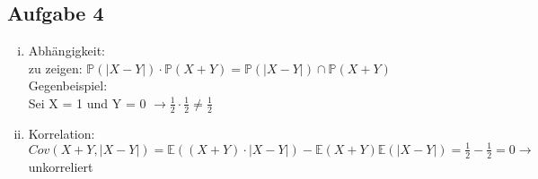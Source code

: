 \documentclass[10pt,a4paper,parskip=half]{scrartcl}
\begin{document}
\subsection*{Aufgabe 4}
\begin{enumerate}[(i)]
\item
Abhängigkeit: \\
zu zeigen:
$\mathbb{P}(|X-Y|) \cdot \mathbb{P}(X+Y) = \mathbb{P}(|X-Y|) \cap \mathbb{P}(X+Y)$ \\
Gegenbeispiel: \\
Sei X = 1 und Y = 0
$\rightarrow \frac{1}{2} \cdot \frac{1}{2} \neq \frac{1}{2}$
\item
Korrelation: \\
$Cov(X+Y, |X-Y|) = \mathbb{E}((X+Y) \cdot |X-Y|) - \mathbb{E}(X+Y)\mathbb{E}(|X-Y|) = \frac{1}{2} - \frac{1}{2} = 0 \rightarrow$ unkorreliert \\
\end{enumerate}
\end{document}
